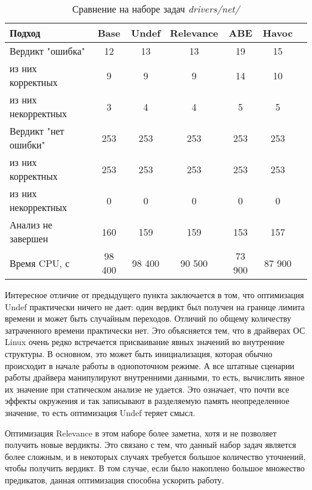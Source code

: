   \begin{table}[h]\footnotesize \centering
    \caption{Сравнение на наборе задач \textit{drivers/net/}}
  	\label{table-drivers-opt}
    \begin{tabular}{ | l | c | c | c | c | c | c |}
      \hline
      Подход         				& Base 		& Undef		& Relevance & ABE 		& Havoc   	\\ \hline
      Вердикт "ошибка" 				& 12  		& 13   		& 13       	& 19   		& 15     	\\ 
  \hspace{0.5cm} из них корректных 	& 9 		& 9 		& 9     	& 14   		& 10     	\\ 
  \hspace{0.5cm} из них некорректных & 3 		& 4 		& 4     	& 5  		& 5      	\\ \hline
      Вердикт "нет ошибки"  		& 253    	& 253    	& 253     	& 253   	& 253    	\\ 
  \hspace{0.5cm} из них корректных 	& 253 		& 253    	& 253       & 253   	& 253    	\\
  \hspace{0.5cm} из них некорректных & 0 		& 0    		& 0      	& 0   		& 0     	\\ \hline
      Анализ не завершен       		& 160    	& 159    	& 159     	& 153   	& 157    	\\ \hline
      Время CPU, с   				& 98 400 	& 98 400 	& 90 500  	& 73 900   	& 87 900    \\ 
      \hline
    \end{tabular}
  \end{table}

Интересное отличие от предыдущего пункта заключается в том, что оптимизация Undef практически ничего не дает: один вердикт был получен на границе лимита времени и может быть случайным переходов.
Отличий по общему количеству затраченного времени практически нет.
Это объясняется тем, что в драйверах ОС Linux очень редко встречается присваивание явных значений во внутренние структуры.
В основном, это может быть инициализация, которая обычно происходит в начале работы в однопоточном режиме.
А все штатные сценарии работы драйвера манипулируют внутренними данными, то есть, вычислить явное их значение при статическом анализе не удается. 
Это означает, что почти все эффекты окружения и так записывают в разделяемую память неопределенное значение, то есть оптимизация Undef теряет смысл.

Оптимизация Relevance в этом наборе более заметна, хотя и не позволяет получить новые вердикты. 
Это связано с тем, что данный набор задач является более сложным, и в некоторых случаях требуется большое количество уточнений, чтобы получить вердикт.
В том случае, если было накоплено большое множество предикатов, данная оптимизация способна ускорить работу.

